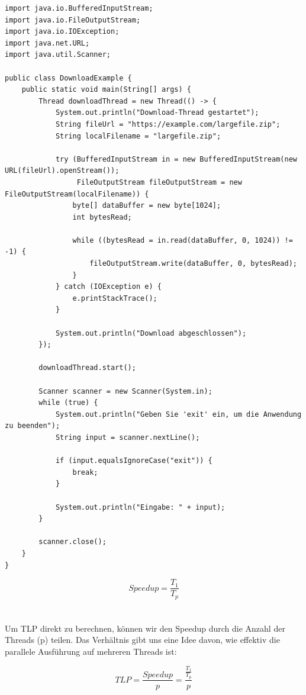 \documentclass[../vs-script-first-v01.tex]{subfiles}
\begin{document}
\noindent\begin{lstlisting}[caption={Threads zur Organisation},captionpos=b,label={lst:down}]
import java.io.BufferedInputStream;
import java.io.FileOutputStream;
import java.io.IOException;
import java.net.URL;
import java.util.Scanner;

public class DownloadExample {
    public static void main(String[] args) {
        Thread downloadThread = new Thread(() -> {
            System.out.println("Download-Thread gestartet");
            String fileUrl = "https://example.com/largefile.zip";
            String localFilename = "largefile.zip";

            try (BufferedInputStream in = new BufferedInputStream(new URL(fileUrl).openStream());
                 FileOutputStream fileOutputStream = new FileOutputStream(localFilename)) {
                byte[] dataBuffer = new byte[1024];
                int bytesRead;

                while ((bytesRead = in.read(dataBuffer, 0, 1024)) != -1) {
                    fileOutputStream.write(dataBuffer, 0, bytesRead);
                }
            } catch (IOException e) {
                e.printStackTrace();
            }

            System.out.println("Download abgeschlossen");
        });

        downloadThread.start();

        Scanner scanner = new Scanner(System.in);
        while (true) {
            System.out.println("Geben Sie 'exit' ein, um die Anwendung zu beenden");
            String input = scanner.nextLine();

            if (input.equalsIgnoreCase("exit")) {
                break;
            }

            System.out.println("Eingabe: " + input);
        }

        scanner.close();
    }
}
\end{lstlisting}

\begin{equation}
    Speedup = \frac{T_1}{T_p}
\end{equation}\\\\


Um TLP direkt zu berechnen, können wir den Speedup durch die Anzahl der Threads (p) teilen. Das Verhältnis gibt uns eine Idee davon, wie effektiv die parallele Ausführung auf mehreren Threads ist:

\begin{equation}
    TLP = \frac{Speedup}{p} = \frac{\frac{T_1}{T_p}}{p}
\end{equation}
\end{document}
